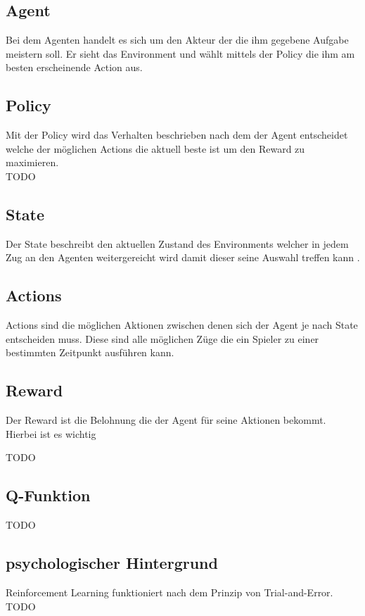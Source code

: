\subsection{Agent}
Bei dem Agenten handelt es sich um den Akteur der die ihm gegebene Aufgabe meistern soll. Er sieht das Environment und wählt mittels der Policy die ihm am besten erscheinende Action aus.

\subsection{Policy}
Mit der Policy wird das Verhalten beschrieben nach dem der Agent entscheidet welche der möglichen Actions die aktuell beste ist um den Reward zu maximieren.\\
\colorbox{red!30}{TODO} %

\subsection{State}
Der State beschreibt den aktuellen Zustand des Environments welcher in jedem Zug  an den Agenten weitergereicht wird damit dieser seine Auswahl treffen kann . 

\subsection{Actions}
Actions sind die möglichen Aktionen zwischen denen sich der Agent je nach State entscheiden muss. Diese sind alle möglichen Züge die ein Spieler zu einer bestimmten Zeitpunkt ausführen kann.

\subsection{Reward}
Der Reward ist die Belohnung die der Agent für seine Aktionen bekommt. Hierbei ist es wichtig 

\colorbox{red!30}{TODO} %

\subsection{Q-Funktion}
\colorbox{red!30}{TODO} %

\subsection{psychologischer Hintergrund}
Reinforcement Learning funktioniert nach dem Prinzip von Trial-and-Error.\\
\colorbox{red!30}{TODO} %











